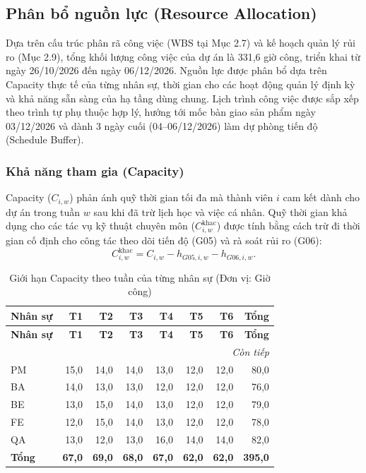 \subsection{Phân bổ nguồn lực (Resource Allocation)}
\label{sec:resource-allocation}

Dựa trên cấu trúc phân rã công việc (WBS tại Mục 2.7) và kế hoạch quản lý rủi ro (Mục 2.9), tổng khối lượng công việc của dự án là 331,6 giờ công, triển khai từ ngày 26/10/2026 đến ngày 06/12/2026. Nguồn lực được phân bổ dựa trên Capacity thực tế của từng nhân sự, thời gian cho các hoạt động quản lý định kỳ và khả năng sẵn sàng của hạ tầng dùng chung. Lịch trình công việc được sắp xếp theo trình tự phụ thuộc hợp lý, hướng tới mốc bàn giao sản phẩm ngày 03/12/2026 và dành 3 ngày cuối (04--06/12/2026) làm dự phòng tiến độ (Schedule Buffer).

\subsubsection{Khả năng tham gia (Capacity)}

Capacity ($C_{i,w}$) phản ánh quỹ thời gian tối đa mà thành viên $i$ cam kết dành cho dự án trong tuần $w$ sau khi đã trừ lịch học và việc cá nhân. Quỹ thời gian khả dụng cho các tác vụ kỹ thuật chuyên môn ($C^{\mathrm{khac}}_{i,w}$) được tính bằng cách trừ đi thời gian cố định cho công tác theo dõi tiến độ (G05) và rà soát rủi ro (G06):
\[C^{\mathrm{khac}}_{i,w}=C_{i,w}-h_{G05,i,w}-h_{G06,i,w}.\]

\begingroup\small
\setlength{\tabcolsep}{4pt}\renewcommand{\arraystretch}{1.15}
\begin{longtable}{@{}l*{7}{r}@{}}
\caption{Giới hạn Capacity theo tuần của từng nhân sự (Đơn vị: Giờ công)}\label{tab:capacity}\\
\toprule
\textbf{Nhân sự} & \textbf{T1} & \textbf{T2} & \textbf{T3} & \textbf{T4} & \textbf{T5} & \textbf{T6} & \textbf{Tổng} \\
\midrule\endfirsthead
\toprule
\textbf{Nhân sự} & \textbf{T1} & \textbf{T2} & \textbf{T3} & \textbf{T4} & \textbf{T5} & \textbf{T6} & \textbf{Tổng} \\
\midrule\endhead
\midrule\multicolumn{8}{r}{\textit{Còn tiếp}}\\\endfoot
\bottomrule\endlastfoot
PM & 15,0 & 14,0 & 14,0 & 13,0 & 12,0 & 12,0 & 80,0 \\
BA & 14,0 & 13,0 & 13,0 & 12,0 & 12,0 & 12,0 & 76,0 \\
BE & 13,0 & 15,0 & 14,0 & 13,0 & 12,0 & 12,0 & 79,0 \\
FE & 12,0 & 15,0 & 14,0 & 13,0 & 12,0 & 12,0 & 78,0 \\
QA & 13,0 & 12,0 & 13,0 & 16,0 & 14,0 & 14,0 & 82,0 \\
\textbf{Tổng} & \textbf{67,0} & \textbf{69,0} & \textbf{68,0} & \textbf{67,0} & \textbf{62,0} & \textbf{62,0} & \textbf{395,0} \\
\end{longtable}\endgroup

